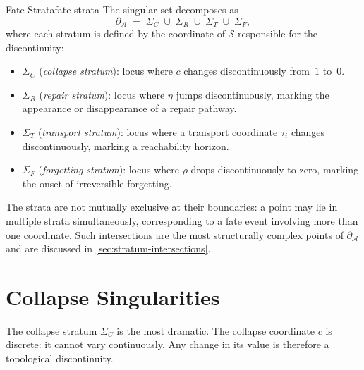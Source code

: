 \documentclass[12pt,twoside,openright]{book}
\newcommand{\fateSpace}{\mathcal{S}}
\newcommand{\survRatio}{\rho}             %
\newcommand{\repEff}{\eta}               %
\newcommand{\collapseInd}{c}             %
\newcommand{\singSet}{\partial_{\!\mathcal{A}}}
\newcommand{\strataC}{\Sigma_{C}}   %
\newcommand{\strataR}{\Sigma_{R}}   %
\newcommand{\strataT}{\Sigma_{T}}   %
\newcommand{\strataF}{\Sigma_{F}}   %
\providecommand{\strataC}{\Sigma_{C}}
\providecommand{\strataR}{\Sigma_{R}}
\providecommand{\strataT}{\Sigma_{T}}
\providecommand{\strataF}{\Sigma_{F}}
\providecommand{\singSet}{\partial_{\!\mathcal{A}}}
\begin{document}
\begin{definition}{Fate Strata}{fate-strata}
The singular set decomposes as
\[
  \singSet
  \;=\;
  \strataC\;\cup\;\strataR\;\cup\;\strataT\;\cup\;\strataF,
\]
where each stratum is defined by the coordinate of $\fateSpace$
responsible for the discontinuity:
\begin{itemize}[nosep,leftmargin=2em]
  \item $\strataC$ (\emph{collapse stratum}): locus where
    $\collapseInd$ changes discontinuously from~$1$ to~$0$.
  \item $\strataR$ (\emph{repair stratum}): locus where $\repEff$
    jumps discontinuously, marking the appearance or disappearance
    of a repair pathway.
  \item $\strataT$ (\emph{transport stratum}): locus where a
    transport coordinate $\tau_i$ changes discontinuously, marking
    a reachability horizon.
  \item $\strataF$ (\emph{forgetting stratum}): locus where
    $\survRatio$ drops discontinuously to zero, marking the onset
    of irreversible forgetting.
\end{itemize}
\end{definition}

The strata are not mutually exclusive at their boundaries: a
point may lie in multiple strata simultaneously, corresponding
to a fate event involving more than one coordinate. Such
intersections are the most structurally complex points of
$\singSet$ and are discussed in
\cref{sec:stratum-intersections}.

\section{Collapse Singularities}

The collapse stratum $\strataC$ is the most dramatic. The
collapse coordinate $\collapseInd$ is discrete: it cannot vary
continuously. Any change in its value is therefore a
topological discontinuity.
\end{document}
